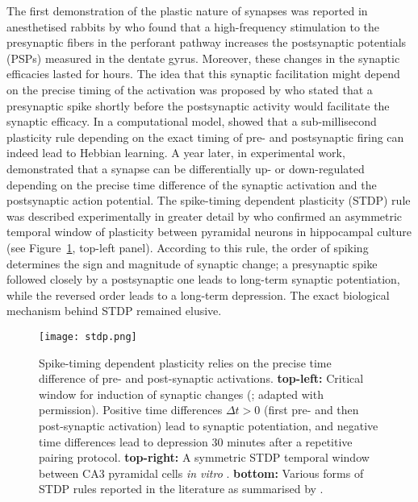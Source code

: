     The first demonstration of the plastic nature of synapses was reported
    in anesthetised rabbits by \cite{Lomo1966} who found that a high-frequency
    stimulation to the presynaptic fibers in the perforant pathway increases
    the postsynaptic potentials (PSPs) measured in the dentate gyrus. Moreover,
    these changes in the synaptic efficacies lasted for hours. The idea that
    this synaptic facilitation might depend on the precise timing of the activation
    was proposed by \cite{Taylor1973} who stated that a presynaptic spike
    shortly before the postsynaptic activity would facilitate the synaptic
    efficacy. In a computational model, \cite{Gerstner1996} showed that a
    sub-millisecond plasticity rule depending on the exact timing of pre- and
    postsynaptic firing can indeed lead to Hebbian learning. A
    year later, in experimental work, \cite{Markram1997} demonstrated that a synapse
    can be differentially up- or down-regulated depending on the precise time
    difference of the synaptic activation and the postsynaptic action
    potential. The spike-timing dependent plasticity (STDP) rule was described
    experimentally in greater detail by \cite{Bi1998} who confirmed an
    asymmetric temporal window of plasticity between pyramidal neurons in
    hippocampal culture (see Figure~\ref{fig:stdp}, top-left panel). According to this
    rule, the order of spiking determines the sign and magnitude of synaptic
    change; a presynaptic spike followed closely by a postsynaptic one leads to
    long-term synaptic potentiation, while the reversed order leads to a
    long-term depression. The exact biological mechanism behind STDP remained
    elusive.

    \begin{figure}
      \center
      \texttt{[image: stdp.png]}
      \caption{
        Spike-timing dependent plasticity relies on the precise time difference
        of pre- and post-synaptic activations. \textbf{top-left:} Critical
        window for induction of synaptic changes (\citealp{Bi1998}; adapted
        with permission).  Positive time differences $\Delta t >0$ (first pre-
        and then post-synaptic activation) lead to synaptic potentiation, and
        negative time differences lead to depression 30 minutes after a
        repetitive pairing protocol. \textbf{top-right:} A symmetric STDP
        temporal window between CA3 pyramidal cells {\it in vitro}
        \citep{Mishra2016}. \textbf{bottom:} Various forms of STDP rules
        reported in the literature as summarised by \cite{Feldman2012}.
             }
    \label{fig:stdp}
    \end{figure}

